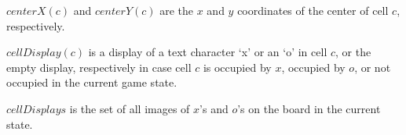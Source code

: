 \documentclass{../src/led_doc}
\begin{document}
\begin{ledDef}
\end{ledDef}

\begin{ledCmnt}
$centerX(c)$ and $centerY(c)$ are the $x$ and $y$ coordinates of the center of cell $c$, respectively.
\end{ledCmnt}

\begin{ledDef}
\end{ledDef}

\begin{ledDef}
\end{ledDef}

\begin{ledCmnt}
$cellDisplay(c)$ is a display of a text character `x' or an `o' in cell $c$,
or the empty display, respectively in case cell $c$ is occupied by $x$, occupied
by $o$, or not occupied in the current game state.
\end{ledCmnt}

\begin{ledDef}
\end{ledDef}

\begin{ledDef}
\end{ledDef}

\begin{ledDef}
\end{ledDef}

\begin{ledCmnt}
$cellDisplays$ is the set of all images of $x$'s and $o$'s on the board in the current state.
\end{ledCmnt}
\end{document}
